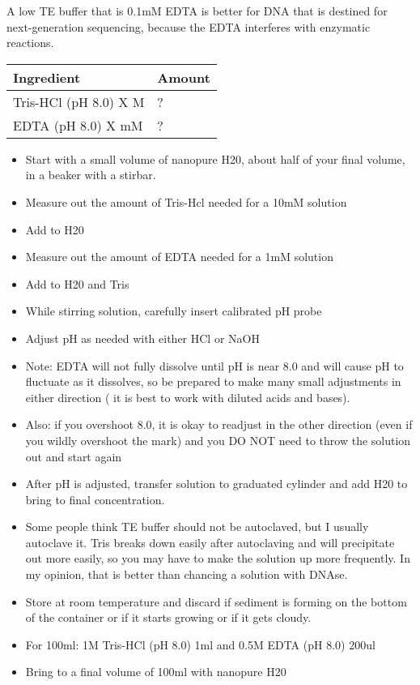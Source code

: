 \documentclass[
  letterpaper,
  DIV=11,
  numbers=noendperiod]{scrreprt}
\begin{document}
A low TE buffer that is 0.1mM EDTA is better for DNA that is destined
for next-generation sequencing, because the EDTA interferes with
enzymatic reactions.

\begin{longtable}[]{@{}ll@{}}
\toprule()
\textbf{Ingredient} & \textbf{Amount} \\
\midrule()
\endhead
Tris-HCl (pH 8.0) X M & ? \\
EDTA (pH 8.0) X mM & ? \\
\bottomrule()
\end{longtable}

\begin{itemize}
\item
  Start with a small volume of nanopure H20, about half of your final
  volume, in a beaker with a stirbar.
\item
  Measure out the amount of Tris-Hcl needed for a 10mM solution
\item
  Add to H20
\item
  Measure out the amount of EDTA needed for a 1mM solution
\item
  Add to H20 and Tris
\item
  While stirring solution, carefully insert calibrated pH probe
\item
  Adjust pH as needed with either HCl or NaOH
\item
  Note: EDTA will not fully dissolve until pH is near 8.0 and will cause
  pH to fluctuate as it dissolves, so be prepared to make many small
  adjustments in either direction ( it is best to work with diluted
  acids and bases).
\item
  Also: if you overshoot 8.0, it is okay to readjust in the other
  direction (even if you wildly overshoot the mark) and you DO NOT need
  to throw the solution out and start again
\item
  After pH is adjusted, transfer solution to graduated cylinder and add
  H20 to bring to final concentration.
\item
  Some people think TE buffer should not be autoclaved, but I usually
  autoclave it. Tris breaks down easily after autoclaving and will
  precipitate out more easily, so you may have to make the solution up
  more frequently. In my opinion, that is better than chancing a
  solution with DNAse.
\item
  Store at room temperature and discard if sediment is forming on the
  bottom of the container or if it starts growing or if it gets cloudy.
\item
  For 100ml: 1M Tris-HCl (pH 8.0) 1ml and 0.5M EDTA (pH 8.0) 200ul
\item
  Bring to a final volume of 100ml with nanopure H20
\end{itemize}
\end{document}
